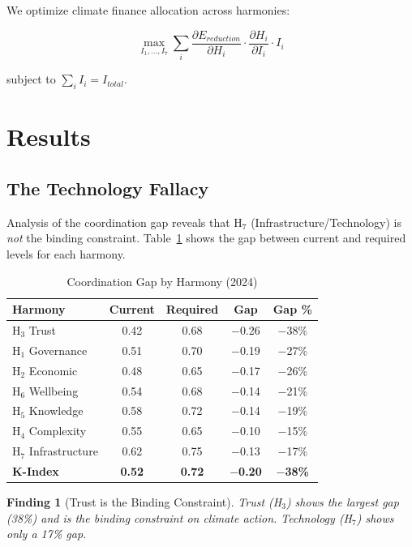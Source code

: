\documentclass[12pt,a4paper]{article}
\newtheorem{finding}{Finding}
\begin{document}
We optimize climate finance allocation across harmonies:

\begin{equation}
\max_{I_1, ..., I_7} \sum_i \frac{\partial E_{reduction}}{\partial H_i} \cdot \frac{\partial H_i}{\partial I_i} \cdot I_i
\end{equation}

subject to $\sum_i I_i = I_{total}$.

\section{Results}
\label{sec:results}

\subsection{The Technology Fallacy}

Analysis of the coordination gap reveals that H$_7$ (Infrastructure/Technology) is \textit{not} the binding constraint. Table~\ref{tab:harmony_gaps} shows the gap between current and required levels for each harmony.

\begin{table}[H]
\centering
\caption{Coordination Gap by Harmony (2024)}
\label{tab:harmony_gaps}
\begin{tabular}{lcccc}
\toprule
\textbf{Harmony} & \textbf{Current} & \textbf{Required} & \textbf{Gap} & \textbf{Gap \%} \\
\midrule
H$_3$ Trust & 0.42 & 0.68 & $-$0.26 & $-$38\% \\
H$_1$ Governance & 0.51 & 0.70 & $-$0.19 & $-$27\% \\
H$_2$ Economic & 0.48 & 0.65 & $-$0.17 & $-$26\% \\
H$_6$ Wellbeing & 0.54 & 0.68 & $-$0.14 & $-$21\% \\
H$_5$ Knowledge & 0.58 & 0.72 & $-$0.14 & $-$19\% \\
H$_4$ Complexity & 0.55 & 0.65 & $-$0.10 & $-$15\% \\
H$_7$ Infrastructure & 0.62 & 0.75 & $-$0.13 & $-$17\% \\
\midrule
\textbf{K-Index} & \textbf{0.52} & \textbf{0.72} & \textbf{$-$0.20} & \textbf{$-$38\%} \\
\bottomrule
\end{tabular}
\end{table}

\begin{finding}[Trust is the Binding Constraint]
Trust (H$_3$) shows the largest gap (38\%) and is the binding constraint on climate action. Technology (H$_7$) shows only a 17\% gap.
\end{finding}
\end{document}

